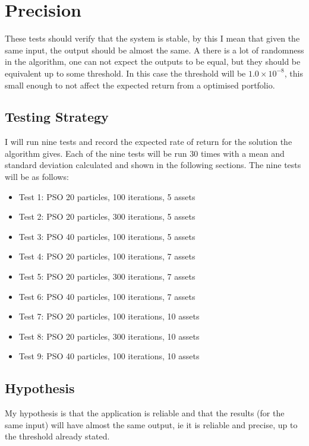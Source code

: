 \documentclass{pdfmx4020}
\begin{document}
  \section{Precision} %
  \label{sec:precision}
  These tests should verify that the system is stable, by this I mean that given the same input, the output should be almost the same. A there is a lot of randomness in the algorithm, one can not expect the outputs to be equal, but they should be equivalent up to some threshold. In this case the threshold will be $1.0\times10^{-8}$, this small enough to not affect the expected return from a optimised portfolio. 

    \subsection{Testing Strategy} %
    \label{sub:testing_strategy}
      I will run nine tests and record the expected rate of return for the solution the algorithm gives. Each of the nine tests will be run 30 times with a mean and standard deviation calculated and shown in the following sections. The nine tests will be as follows:
        \begin{itemize}
          \item Test 1: PSO 20 particles, 100 iterations, 5 assets
          \item Test 2: PSO 20 particles, 300 iterations, 5 assets
          \item Test 3: PSO 40 particles, 100 iterations, 5 assets
          \item Test 4: PSO 20 particles, 100 iterations, 7 assets
          \item Test 5: PSO 20 particles, 300 iterations, 7 assets
          \item Test 6: PSO 40 particles, 100 iterations, 7 assets
          \item Test 7: PSO 20 particles, 100 iterations, 10 assets
          \item Test 8: PSO 20 particles, 300 iterations, 10 assets
          \item Test 9: PSO 40 particles, 100 iterations, 10 assets
        \end{itemize}

    \subsection{Hypothesis} %
    \label{sub:hypothesis}
      My hypothesis is that the application is reliable and that the results (for the same input) will have almost the same output, ie it is reliable and precise, up to the threshold already stated. 
\end{document}

